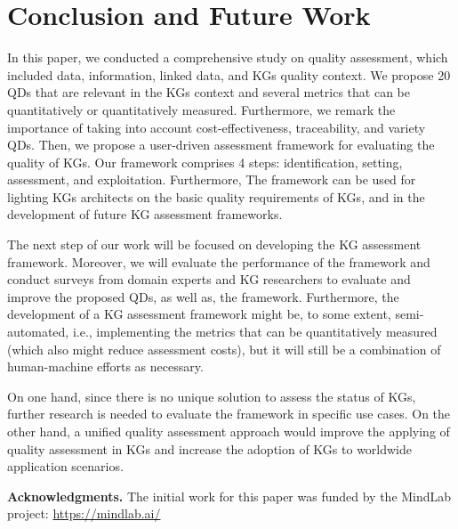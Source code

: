 \documentclass[runningheads]{llncs}
\begin{document}
\section{Conclusion and Future Work}
\label{sec:conclusion}
%
In this paper, we conducted a comprehensive study on quality assessment, which included data, information, linked data, and KGs quality context. We propose 20 QDs that are relevant in the KGs context and several metrics that can be quantitatively or quantitatively measured. Furthermore, we remark the importance of taking into account cost-effectiveness, traceability, and variety QDs. Then, we propose a user-driven assessment framework for evaluating the quality of KGs. Our framework comprises 4 steps: identification, setting, assessment, and exploitation. 
Furthermore, The framework can be used for lighting KGs architects on the basic quality requirements of KGs, and in the development of future KG assessment frameworks.

The next step of our work will be focused on developing the KG assessment framework. Moreover, we will evaluate the performance of the framework and conduct surveys from domain experts and KG researchers to evaluate and improve the proposed QDs, as well as, the framework. Furthermore, the development of a KG assessment framework might be, to some extent, semi-automated, i.e., implementing the metrics that can be quantitatively measured (which also might reduce assessment costs), but it will still be a combination of human-machine efforts as necessary.

On one hand, since there is no unique solution to assess the status of KGs, further research is needed to evaluate the framework in specific use cases. On the other hand, a unified quality assessment approach would improve the applying of quality assessment in KGs and increase the adoption of KGs to worldwide application scenarios.
%

\textbf{Acknowledgments.} The initial work for this paper was funded by the MindLab project: \url{https://mindlab.ai/}
%



\end{document}
